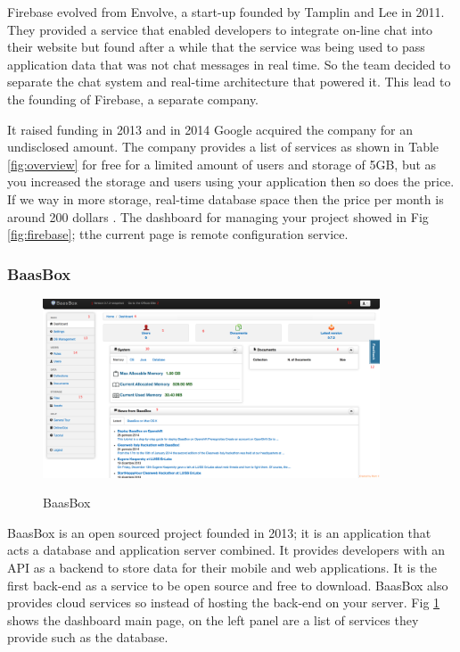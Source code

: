 Firebase \cite{firebase}  evolved from Envolve, a start-up founded by Tamplin and Lee in 2011. They provided a service that enabled developers to integrate on-line chat into their website but found after a while that the service was being used to pass application data that was not chat messages in real time. So the team decided to separate the chat system and real-time architecture that powered it. This lead to the founding of Firebase, a separate company.

It raised funding in 2013 and in 2014 Google acquired the company for an undisclosed amount. The company provides a list of services as shown in Table \ref{fig:overview} for free for a limited amount of users and storage of 5GB, but as you increased the storage and users using your application then so does the price. If we way in more storage, real-time database space then the price per month is around 200 dollars \cite{firebase2}. The dashboard for managing your project showed in Fig \ref{fig:firebase}; tthe current page is remote configuration service.

\subsubsection{BaasBox}

\begin{figure}[!h]
    \caption{BaasBox}
    \centering
    \includegraphics[width=100mm]{images/baasbox}
    \label{fig:baasbox}
\end{figure}

BaasBox \cite{baasBox} is an open sourced project founded in 2013; it is an application that acts a database and application server combined. It provides developers with an API as a backend to store data for their mobile and web applications. It is the first back-end as a service to be open source and free to download. BaasBox also provides cloud services so instead of hosting the back-end on your server. Fig \ref{fig:baasbox} shows the dashboard main page, on the left panel are a list of services they provide such as the database.

